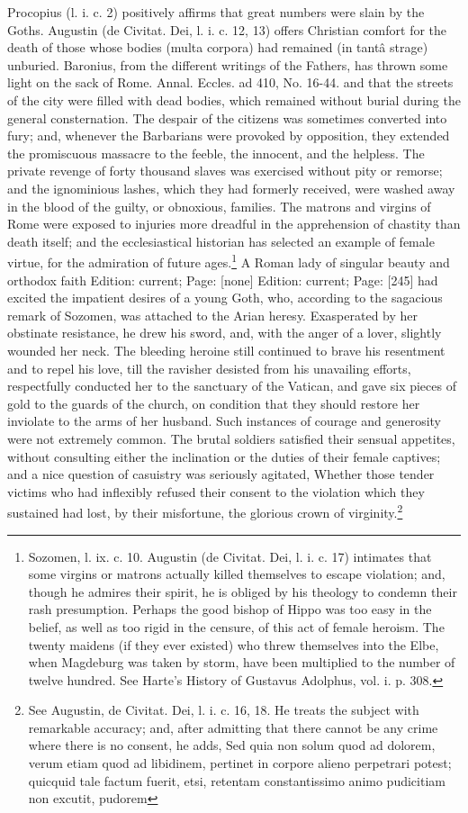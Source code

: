 {Procopius (l. i. c. 2) positively affirms that great numbers were slain by the Goths. Augustin (de Civitat. Dei, l. i. c. 12, 13) offers Christian comfort for the death of those whose bodies (multa corpora) had remained (in tantâ strage) unburied. Baronius, from the different writings of the Fathers, has thrown some light on the sack of Rome. Annal. Eccles. ad 410, No. 16-44.} and that the streets of the city were filled with dead bodies, which remained without burial during the general consternation. The despair of the citizens was sometimes converted into fury; and, whenever the Barbarians were provoked by opposition, they extended the promiscuous massacre to the feeble, the innocent, and the helpless. The private revenge of forty thousand slaves was exercised without pity or remorse; and the ignominious lashes, which they had formerly received, were washed away in the blood of the guilty, or obnoxious, families. The matrons and virgins of Rome were exposed to injuries more dreadful in the apprehension of chastity than death itself; and the ecclesiastical historian has selected an example of female virtue, for the admiration of future ages.\footnote{Sozomen, l. ix. c. 10. Augustin (de Civitat. Dei, l. i. c. 17) intimates that some virgins or matrons actually killed themselves to escape violation; and, though he admires their spirit, he is obliged by his theology to condemn their rash presumption. Perhaps the good bishop of Hippo was too easy in the belief, as well as too rigid in the censure, of this act of female heroism. The twenty maidens (if they ever existed) who threw themselves into the Elbe, when Magdeburg was taken by storm, have been multiplied to the number of twelve hundred. See Harte\texthebrew{}’s History of Gustavus Adolphus, vol. i. p. 308.} A Roman lady of singular beauty and orthodox faith Edition: current; Page: [none] Edition: current; Page: [245] had excited the impatient desires of a young Goth, who, according to the sagacious remark of Sozomen, was attached to the Arian heresy. Exasperated by her obstinate resistance, he drew his sword, and, with the anger of a lover, slightly wounded her neck. The bleeding heroine still continued to brave his resentment and to repel his love, till the ravisher desisted from his unavailing efforts, respectfully conducted her to the sanctuary of the Vatican, and gave six pieces of gold to the guards of the church, on condition that they should restore her inviolate to the arms of her husband. Such instances of courage and generosity were not extremely common. The brutal soldiers satisfied their sensual appetites, without consulting either the inclination or the duties of their female captives; and a nice question of casuistry was seriously agitated, Whether those tender victims who had inflexibly refused their consent to the violation which they sustained had lost, by their misfortune, the glorious crown of virginity.\footnote{See Augustin, de Civitat. Dei, l. i. c. 16, 18. He treats the subject with remarkable accuracy; and, after admitting that there cannot be any crime where there is no consent, he adds, Sed quia non solum quod ad dolorem, verum etiam quod ad libidinem, pertinet in corpore alieno perpetrari potest; quicquid tale factum fuerit, etsi, retentam constantissimo animo pudicitiam non excutit, pudorem }
